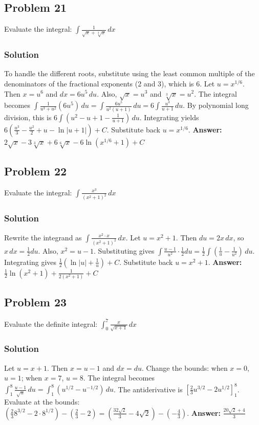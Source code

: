\documentclass{article}
\begin{document}
\subsection{Problem 21}
Evaluate the integral: $ \int \frac{1}{\sqrt{x} + \sqrt[3]{x}} \,dx $
\subsubsection*{Solution}
To handle the different roots, substitute using the least common multiple of the denominators of the fractional exponents (2 and 3), which is 6.
Let $u = x^{1/6}$. Then $x=u^6$ and $dx = 6u^5 \,du$. Also, $\sqrt{x} = u^3$ and $\sqrt[3]{x} = u^2$.
The integral becomes $ \int \frac{1}{u^3+u^2} (6u^5) \,du = \int \frac{6u^5}{u^2(u+1)} \,du = 6 \int \frac{u^3}{u+1} \,du $.
By polynomial long division, this is $ 6 \int \left(u^2 - u + 1 - \frac{1}{u+1}\right) \,du $.
Integrating yields $ 6\left(\frac{u^3}{3} - \frac{u^2}{2} + u - \ln|u+1|\right) + C $.
Substitute back $u=x^{1/6}$.
\textbf{Answer:} $ 2\sqrt{x} - 3\sqrt[3]{x} + 6\sqrt[6]{x} - 6\ln(x^{1/6}+1) + C $

\subsection{Problem 22}
Evaluate the integral: $ \int \frac{x^3}{(x^2+1)^2} \,dx $
\subsubsection*{Solution}
Rewrite the integrand as $ \int \frac{x^2 \cdot x}{(x^2+1)^2} \,dx $.
Let $u = x^2+1$. Then $du = 2x\,dx$, so $x\,dx = \frac{1}{2}du$. Also, $x^2 = u-1$.
Substituting gives $ \int \frac{u-1}{u^2} \cdot \frac{1}{2}du = \frac{1}{2} \int \left(\frac{1}{u} - \frac{1}{u^2}\right) \,du $.
Integrating gives $ \frac{1}{2}\left(\ln|u| + \frac{1}{u}\right) + C $.
Substitute back $u = x^2+1$.
\textbf{Answer:} $ \frac{1}{2}\ln(x^2+1) + \frac{1}{2(x^2+1)} + C $

\subsection{Problem 23}
Evaluate the definite integral: $ \int_{0}^{7} \frac{x}{\sqrt{x+1}} \,dx $
\subsubsection*{Solution}
Let $u = x+1$. Then $x=u-1$ and $dx=du$.
Change the bounds: when $x=0$, $u=1$; when $x=7$, $u=8$.
The integral becomes $ \int_{1}^{8} \frac{u-1}{\sqrt{u}} \,du = \int_{1}^{8} (u^{1/2} - u^{-1/2}) \,du $.
The antiderivative is $ \left[ \frac{2}{3}u^{3/2} - 2u^{1/2} \right]_{1}^{8} $.
Evaluate at the bounds: $ \left(\frac{2}{3}8^{3/2} - 2\cdot 8^{1/2}\right) - \left(\frac{2}{3} - 2\right) = \left(\frac{32\sqrt{2}}{3} - 4\sqrt{2}\right) - \left(-\frac{4}{3}\right) $.
\textbf{Answer:} $ \frac{20\sqrt{2} + 4}{3} $
\end{document}
